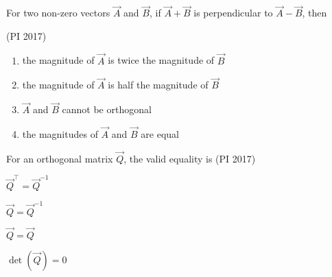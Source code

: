 \item For two non-zero vectors ${\vec{A}}$ and ${\vec{B}}$, if ${\vec{A}} + {\vec{B}}$ is perpendicular to ${\vec{A}} - {\vec{B}}$, then

\hfill (PI 2017)
\begin{enumerate}
\item the magnitude of ${\vec{A}}$ is twice the magnitude of ${\vec{B}}$
\item the magnitude of ${\vec{A}}$ is half the magnitude of ${\vec{B}}$
\item ${\vec{A}}$ and ${\vec{B}}$ cannot be orthogonal
\item the magnitudes of ${\vec{A}}$ and ${\vec{B}}$ are equal
\end{enumerate}

\item For an orthogonal matrix $\vec{Q}$, the valid equality is
\hfill (PI 2017)
\begin{enumerate}
\begin{multicols}{4}
\item $\vec{Q}^{\top} = \vec{Q}^{-1}$
\item $\vec{Q} = \vec{Q}^{-1}$
\item $\vec{Q} = \vec{Q}$
\item $\det(\vec{Q}) = 0$
\end{multicols}
\end{enumerate}

